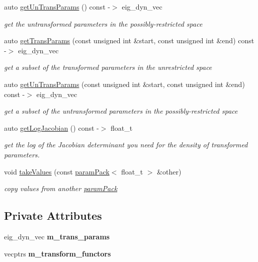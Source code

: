\begin{DoxyCompactItemize}
auto \hyperlink{classparamPack_ad655cb6e6fea5c5f7d2e3c158467e7db}{get\+Un\+Trans\+Params} () const -\/$>$ eig\+\_\+dyn\+\_\+vec
\begin{DoxyCompactList}\small\item\em get the untransformed parameters in the possibly-\/restricted space \end{DoxyCompactList}\item 
auto \hyperlink{classparamPack_a078ccf2804e0cb8e0e02cfda73118c37}{get\+Trans\+Params} (const unsigned int \&start, const unsigned int \&end) const -\/$>$ eig\+\_\+dyn\+\_\+vec
\begin{DoxyCompactList}\small\item\em get a subset of the transformed parameters in the unrestricted space \end{DoxyCompactList}\item 
auto \hyperlink{classparamPack_abe83b3043897bf62b6026f6c461942c6}{get\+Un\+Trans\+Params} (const unsigned int \&start, const unsigned int \&end) const -\/$>$ eig\+\_\+dyn\+\_\+vec
\begin{DoxyCompactList}\small\item\em get a subset of the untransformed parameters in the possibly-\/restricted space \end{DoxyCompactList}\item 
auto \hyperlink{classparamPack_a0febeb3a640212940e0ef351dae5a599}{get\+Log\+Jacobian} () const -\/$>$ float\+\_\+t
\begin{DoxyCompactList}\small\item\em get the log of the Jacobian determinant you need for the density of transformed parameters. \end{DoxyCompactList}\item 
void \hyperlink{classparamPack_aa0826edf3da82e1b8ffe133f14e6f119}{take\+Values} (const \hyperlink{classparamPack}{param\+Pack}$<$ float\+\_\+t $>$ \&other)
\begin{DoxyCompactList}\small\item\em copy values from another \hyperlink{classparamPack}{param\+Pack} \end{DoxyCompactList}\end{DoxyCompactItemize}
\subsection*{Private Attributes}
\begin{DoxyCompactItemize}
\item 
\mbox{\label{classparamPack_ad18231aa0b5d090c81bdb87a62b05fbd}} 
eig\+\_\+dyn\+\_\+vec {\bfseries m\+\_\+trans\+\_\+params}
\item 
\mbox{\label{classparamPack_a5a42b680acc71cf54ba1d5c9925b4776}} 
vecptrs {\bfseries m\+\_\+transform\+\_\+functors}
\end{DoxyCompactItemize}


